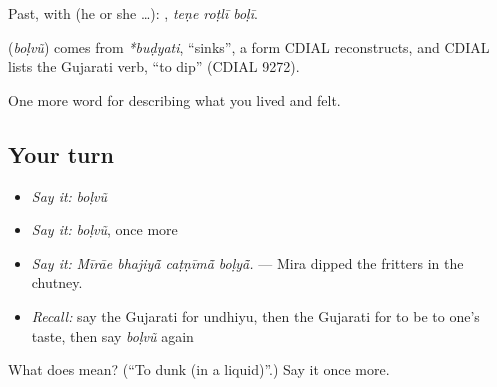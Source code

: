 Past, with  (he or she …):   , \emph{teṇe roṭlī boḷī}.

\begin{cousinweb}
\textbf{} (\emph{boḷvũ}) comes from \emph{*buḍyati}, \textquotedblleft{}sinks\textquotedblright{}, a form CDIAL reconstructs, and CDIAL lists the Gujarati verb, \textquotedblleft{}to dip\textquotedblright{} (CDIAL 9272).
\end{cousinweb}

\begin{grammarlens}[title={What you've built}]
One more word for describing what you lived and felt.
\end{grammarlens}

\subsection*{Your turn}
\begin{itemize}
\raggedright
  \item \emph{Say it:} \emph{boḷvũ}
  \item \emph{Say it:} \emph{boḷvũ}, once more
  \item \emph{Say it:} \emph{Mīrāe bhajiyā̃ caṭṇīmā̃ boḷyā̃.} — Mira dipped the fritters in the chutney.
  \item \emph{Recall:} say the Gujarati for undhiyu, then the Gujarati for to be to one's taste, then say \emph{boḷvũ} again
\end{itemize}

\begin{tcolorbox}[breakable,colback=teal!4,colframe=teal!35!black,title={Before you move on}]
What does  mean? (\textquotedblleft{}To dunk (in a liquid)\textquotedblright{}.) Say it once more.
\end{tcolorbox}
